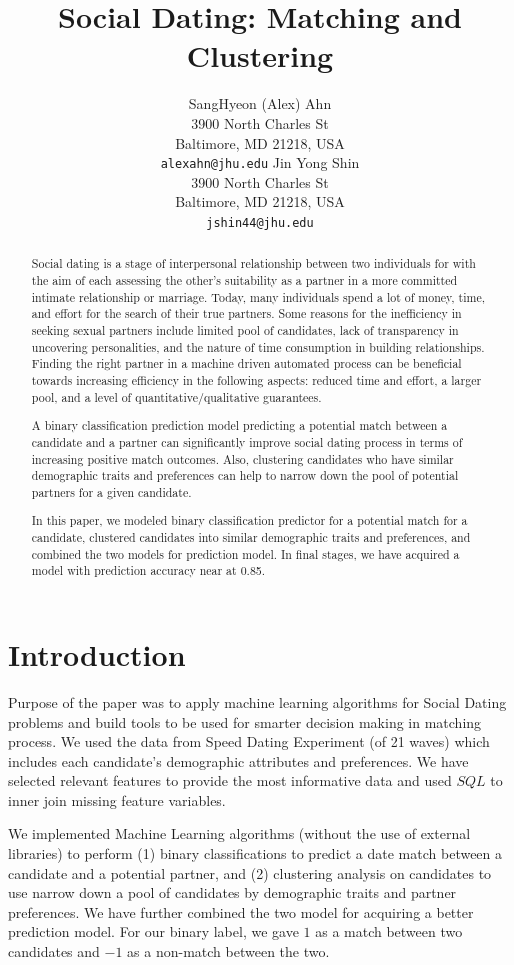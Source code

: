 \documentclass[11pt,letterpaper]{article}
\title{Social Dating: Matching and Clustering}
\author{
  SangHyeon (Alex) Ahn\\
  3900 North Charles St\\
  Baltimore, MD 21218, USA\\
  {\tt alexahn@jhu.edu}
  \And
  Jin Yong Shin\\
  3900 North Charles St\\
  Baltimore, MD 21218, USA\\
  {\tt jshin44@jhu.edu}
}
\date{}
\begin{document}
\maketitle
\begin{abstract}
Social dating is a stage of interpersonal relationship between two individuals for with the aim of each assessing the other's suitability as a partner in a more committed intimate relationship or marriage. Today, many individuals spend a lot of money, time, and effort for the search of their true partners. Some reasons for the inefficiency in seeking sexual partners include limited pool of candidates, lack of transparency in uncovering personalities, and the nature of time consumption in building relationships. Finding the right partner in a machine driven automated process can be beneficial towards increasing efficiency in the following aspects: reduced time and effort, a larger pool, and a level of quantitative/qualitative guarantees.

A binary classification prediction model predicting a potential match between a candidate and a partner can significantly improve social dating process in terms of increasing positive match outcomes. Also, clustering candidates who have similar demographic traits and preferences can help to narrow down the pool of potential partners for a given candidate.

In this paper, we modeled binary classification predictor for a potential match for a candidate, clustered candidates into similar demographic traits and preferences, and combined the two models for prediction model. In final stages, we have acquired a model with prediction accuracy near at 0.85.

\end{abstract}

\section{Introduction}
Purpose of the paper was to apply machine learning algorithms for Social Dating problems and build tools to be used for smarter decision making in matching process. We used the data from Speed Dating Experiment (of 21 waves) which includes each candidate's demographic attributes and preferences. We have selected relevant features to provide the most informative data and used $SQL$ to inner join missing feature variables.

We implemented Machine Learning algorithms (without the use of external libraries) to perform (1) binary classifications to predict a date match between a candidate and a potential partner, and (2) clustering analysis on candidates to use narrow down a pool of candidates by demographic traits and partner preferences. We have further combined the two model for acquiring a better prediction model. For our binary label, we gave $1$ as a match between two candidates and $-1$ as a non-match between the two.\\
\end{document}
